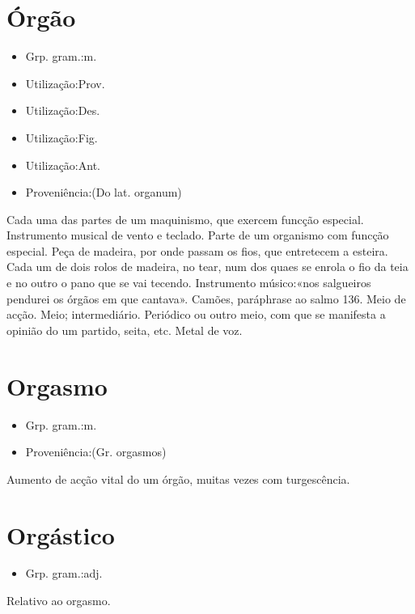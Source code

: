 \section{Órgão}
\begin{itemize}
\item {Grp. gram.:m.}
\end{itemize}
\begin{itemize}
\item {Utilização:Prov.}
\end{itemize}
\begin{itemize}
\item {Utilização:Des.}
\end{itemize}
\begin{itemize}
\item {Utilização:Fig.}
\end{itemize}
\begin{itemize}
\item {Utilização:Ant.}
\end{itemize}
\begin{itemize}
\item {Proveniência:(Do lat. \textunderscore organum\textunderscore )}
\end{itemize}
Cada uma das partes de um maquinismo, que exercem funcção especial.
Instrumento musical de vento e teclado.
Parte de um organismo com funcção especial.
Peça de madeira, por onde passam os fios, que entretecem a esteira.
Cada um de dois rolos de madeira, no tear, num dos quaes se enrola o fio da teia e no outro o pano que se vai tecendo.
Instrumento músico:«\textunderscore nos salgueiros pendurei os órgãos em que cantava\textunderscore ». Camões, paráphrase ao salmo 136.
Meio de acção.
Meio; intermediário.
Periódico ou outro meio, com que se manifesta a opinião do um partido, seita, etc.
Metal de voz.
\section{Orgasmo}
\begin{itemize}
\item {Grp. gram.:m.}
\end{itemize}
\begin{itemize}
\item {Proveniência:(Gr. \textunderscore orgasmos\textunderscore )}
\end{itemize}
Aumento de acção vital do um órgão, muitas vezes com turgescência.
\section{Orgástico}
\begin{itemize}
\item {Grp. gram.:adj.}
\end{itemize}
Relativo ao orgasmo.

